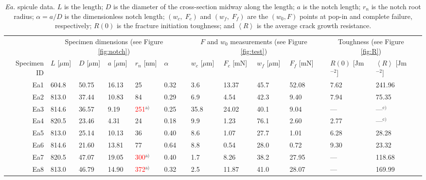 \documentclass[12pt,onecolumn]{article}
\makeatletter
\newcommand{\EA}{\textit{Ea.\@}\xspace}
\newcommand{\ra}[1]{\renewcommand{\arraystretch}{#1}}
\makeatother
\begin{document}
 
\clearpage
\thispagestyle{empty}
\begin{landscape}

\begin{table}
{\scriptsize
\centering
\caption{\EA spicule data. $L$ is the length; $D$ is the diameter of the cross-section midway along the length; $a$ is the notch length; $r_n$ is the notch root radius; $\alpha=a/D$ is the dimensionless notch length; $(w_c,\;F_c)$ and $(w_f,\;F_f)$ are the $(w_0,F)$ points at pop-in and complete failure, respectively; $R(0)$ is the fracture initiation toughness; and $\left< R \right>$ is the average crack growth resistance.}
\label{tab:EAdata}
\ra{1.25}
\begin{threeparttable}[t]
\begin{tabular}{rllllllllllllll}
\toprule
& \multicolumn{5}{c}{Specimen dimensions (see Figure \ref{fig:notch})} & & \multicolumn{4}{c}{$F$ and $w_0$ measurements (see Figure \ref{fig:test})} & & \multicolumn{2}{c}{Toughness (see Figure \ref{fig:R})} \\
\cmidrule{2-6} \cmidrule{8-11} \cmidrule{13-14}
Specimen ID & $L$ [$\mu$m] & $D$ [$\mu$m] & $a$ [$\mu$m] & $r_n$ [nm] & $\alpha$ & & $w_c$ [$\mu$m] & $F_c$ [mN] & $w_f$ [$\mu$m] & $F_f$ [mN] & & $R(0)$ [Jm$^{-2}$] & $\left< R \right>$ [Jm$^{-2}$] \\
\midrule
Ea1 & 604.8 & 50.75 & 16.13 &   25 & 0.32 &  &  3.6 & 13.37 & 45.7 & 52.08 &  & 7.62 &241.96 \\ 
Ea2 & 813.0 & 37.44 & 10.83 &   84 & 0.29 &  &  6.9 & 4.54 & 42.3 & 9.40 &  & 7.94 &75.35 \\ 
Ea3 & 814.6 & 36.57 & 9.19 &  \textcolor{red}{251}$^\text{a)}$ & 0.25 &  & 35.8 & 24.02 & 40.1 & 9.04 &  & --- &---$^\text{c)}$\\ 
Ea4 & 820.5 & 23.46 & 4.31 &   24 & 0.18 &  &  9.9 & 1.23 & 76.1 & 2.60 &  & 2.77 &---$^\text{c)}$\\ 
Ea5 & 813.0 & 25.14 & 10.13 &   36 & 0.40 &  &  8.6 & 1.07 & 27.7 & 1.01 &  & 6.28 &28.28 \\ 
Ea6 & 814.6 & 21.60 & 13.81 &   77 & 0.64 &  &  8.8 & 0.54 & 28.0 & 0.72 &  & 9.30 &23.32 \\ 
Ea7 & 820.5 & 47.07 & 19.05 &  \textcolor{red}{300}$^\text{a)}$ & 0.40 &  &  1.7 & 8.26 & 38.2 & 27.95 &  & --- &118.68 \\ 
Ea8 & 813.0 & 46.79 & 14.90 &  \textcolor{red}{372}$^\text{a)}$ & 0.32 &  &  2.5 & 11.87 & 41.0 & 28.07 &  & --- &169.99 \\ 

\end{tabular}
\end{threeparttable}}
\end{table}
\end{landscape}
\end{document}
